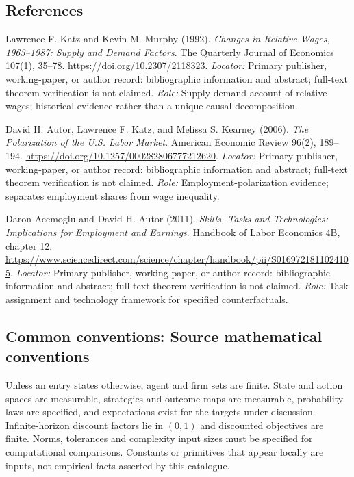 \documentclass[11pt,a4paper]{article}
\begin{document}
\subsection*{References}
\begin{enumerate}[label=\textnormal{[S\arabic*]},leftmargin=*]
\item Lawrence F. Katz and Kevin M. Murphy (1992). \emph{Changes in Relative Wages, 1963--1987: Supply and Demand Factors}. The Quarterly Journal of Economics 107(1), 35--78. \url{https://doi.org/10.2307/2118323}. \textit{Locator:} Primary publisher, working-paper, or author record: bibliographic information and abstract; full-text theorem verification is not claimed. \textit{Role:} Supply-demand account of relative wages; historical evidence rather than a unique causal decomposition.
\item David H. Autor, Lawrence F. Katz, and Melissa S. Kearney (2006). \emph{The Polarization of the U.S. Labor Market}. American Economic Review 96(2), 189--194. \url{https://doi.org/10.1257/000282806777212620}. \textit{Locator:} Primary publisher, working-paper, or author record: bibliographic information and abstract; full-text theorem verification is not claimed. \textit{Role:} Employment-polarization evidence; separates employment shares from wage inequality.
\item Daron Acemoglu and David H. Autor (2011). \emph{Skills, Tasks and Technologies: Implications for Employment and Earnings}. Handbook of Labor Economics 4B, chapter 12. \url{https://www.sciencedirect.com/science/chapter/handbook/pii/S0169721811024105}. \textit{Locator:} Primary publisher, working-paper, or author record: bibliographic information and abstract; full-text theorem verification is not claimed. \textit{Role:} Task assignment and technology framework for specified counterfactuals.
\end{enumerate}

\subsection*{Common conventions: Source mathematical conventions}

Unless an entry states otherwise, agent and firm sets are finite. State and action spaces are measurable, strategies and outcome maps are measurable, probability laws are specified, and expectations exist for the targets under discussion. Infinite-horizon discount factors lie in $(0,1)$ and discounted objectives are finite. Norms, tolerances and complexity input sizes must be specified for computational comparisons. Constants or primitives that appear locally are inputs, not empirical facts asserted by this catalogue.
\end{document}
